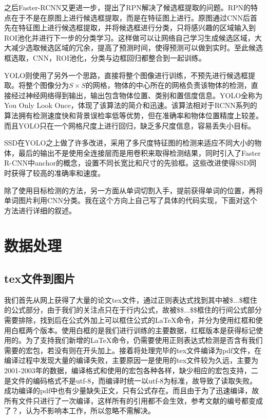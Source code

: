 \documentclass[12pt]{article}
\begin{document}
之后Faster-RCNN\cite{ftrcnn}又更进一步，提出了RPN解决了候选框提取的问题。RPN的特点在于不是在原图上进行候选框提取，而是在特征图上进行。原图通过CNN后首先在特征图上进行候选框提取，并将候选框进行分类，只将感兴趣的区域输入到ROI池化并进行下一步的分类学习。这样做可以让网络自己学习生成候选区域，大大减少选取候选区域的冗余，提高了预测时间，使得预测可以做到实时。至此候选框选取，CNN，ROI池化，分类与边框回归都整合到一起训练。

YOLO\cite{yolo}则使用了另外一个思路，直接将整个图像进行训练，不预先进行候选框提取。将整个图像分为$S \times S$的网格，物体的中心所在的网格负责该物体的检测，直接经过神经网络得到输出，输出包含物体位置、类别和置信度信息。YOLO全称为You Only Look Once，体现了该算法的简介和迅速。该算法相对于RCNN系列的算法拥有检测速度快和背景误检率低等优势，但在准确率和物体位置精度上较差。而且YOLO只在一个网格尺度上进行回归，缺乏多尺度信息，容易丢失小目标。

SSD\cite{ssd}在YOLO之上做了许多改进，采用了多尺度特征图的检测来适应不同大小的物体，最后的输出不是使用全连接层而是用卷积来取得检测结果，同时引入了Faster R-CNN中anchor的概念，设置不同长宽比和尺寸的先验框。这些改进使得SSD同时获得了较高的准确率和速度。

除了使用目标检测的方法，另一方面从单词切割入手，提前获得单词的位置，再将单词图片利用CNN分类。我在这个方向上自己写了具体的代码实现，下面对这个方法进行详细的叙述。



\section{数据处理}

\subsection{tex文件到图片}
\noindent

我们首先从网上获得了大量的论文tex文件，通过正则表达式找到其中被\$...\$框住的公式部分，由于我们的关注点只在于行内公式，故被\$\$...\$\$框住的行间公式部分需要排除，找到后在公式外加上可以框住公式的LaTeX命令，并分为使用红框和使用白框两个版本。使用白框的是我们进行训练的主要数据，红框版本是获得标记使用的。为了支持我们新增的LaTeX命令，仍需要使用正则表达式检测是否含有我们需要的宏包，若没有则在开头加上。接着将处理完毕的tex文件编译为pdf文件，在编译过程中发现大量的编译失败，主要原因一是使用的tex文件较为久远，主要为2001-2003年的数据，编译格式和使用的宏包各种各样，缺少相应的宏包支持，二是文件的编码格式不是utf-8，而编译时统一以utf-8为标准，故导致了读取失败。成功编译的pdf中也有少量缺失正文，只有公式存在。而且由于为了迅速编译，故所有文件只进行了一次编译，这样所有的引用都不会生效，参考文献的编号都变成了？，认为不影响本工作，所以忽略不需解决。
\end{document}
